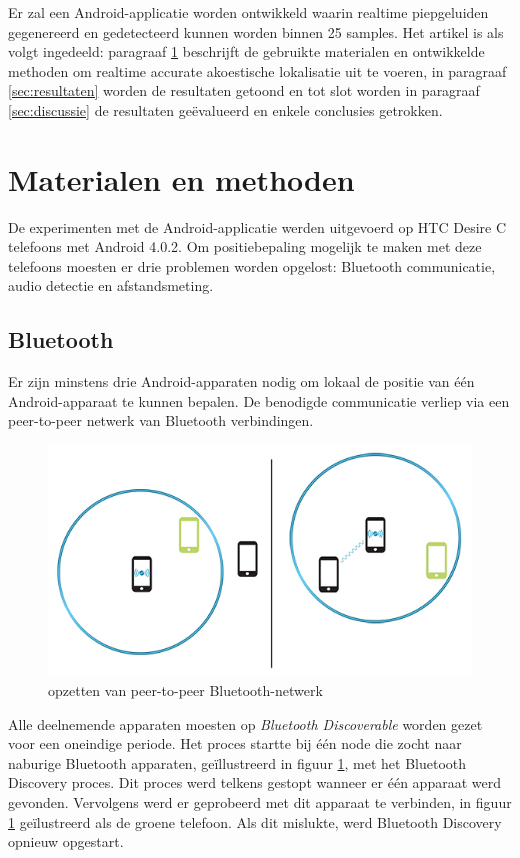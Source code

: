 \documentclass[12pt]{article}
\begin{document}
Er zal een Android-applicatie worden ontwikkeld waarin realtime piepgeluiden gegenereerd en gedetecteerd kunnen worden binnen 25 samples. Het artikel is als volgt ingedeeld: paragraaf \ref{sec:materialen} beschrijft de gebruikte materialen en ontwikkelde methoden om realtime accurate akoestische lokalisatie uit te voeren, in paragraaf \ref{sec:resultaten} worden de resultaten getoond en tot slot worden in paragraaf \ref{sec:discussie} de resultaten ge\"evalueerd en enkele conclusies getrokken.

\section{Materialen en methoden}
\label{sec:materialen}
De experimenten met de Android-applicatie werden uitgevoerd op HTC Desire C telefoons met Android 4.0.2. Om positiebepaling mogelijk te maken met deze telefoons moesten er drie problemen worden opgelost: Bluetooth communicatie, audio detectie en afstandsmeting.

\subsection{Bluetooth}
Er zijn minstens drie Android-apparaten nodig om lokaal de positie van \'e\'en Android-apparaat te kunnen bepalen. De benodigde communicatie verliep via een peer-to-peer \cite{schollmeier2001definition} netwerk van Bluetooth \cite{haartsen2000bluetooth} verbindingen.

\begin{figure}[h]
\centering
\includegraphics[scale=0.5]{bluetooth}
\caption{opzetten van peer-to-peer Bluetooth-netwerk}
\label{fig:bt}
\end{figure}

Alle deelnemende apparaten moesten op \textit{Bluetooth Discoverable} worden gezet voor een oneindige periode.
Het proces startte bij \'e\'en node die zocht naar naburige Bluetooth apparaten, ge\"illustreerd in figuur \ref{fig:bt}, met het Bluetooth Discovery proces.
Dit proces werd telkens gestopt wanneer er \'e\'en apparaat werd gevonden. Vervolgens werd er geprobeerd met dit apparaat te verbinden, in figuur \ref{fig:bt} ge\"ilustreerd als de groene telefoon. Als dit mislukte, werd Bluetooth Discovery opnieuw opgestart.
\end{document}
